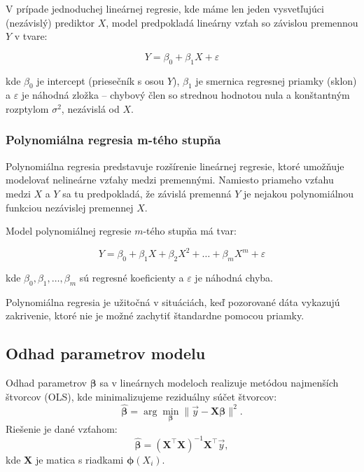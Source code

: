 V prípade jednoduchej lineárnej regresie, kde máme len jeden vysvetľujúci (nezávislý) prediktor $X$, model predpokladá lineárny vzťah so závislou premennou $Y$ v tvare:

\begin{equation}
Y = \beta_0 + \beta_1 X + \varepsilon
\end{equation}

kde $\beta_0$ je intercept (priesečník s osou $Y$), $\beta_1$ je smernica regresnej priamky (sklon) a $\varepsilon$ je náhodná zložka – chybový člen so strednou hodnotou nula a konštantným rozptylom $\sigma^2$, nezávislá od $X$.

\subsubsection{Polynomiálna regresia m-tého stupňa}
\label{subsec:polynomial_regression}

Polynomiálna regresia predstavuje rozšírenie lineárnej regresie, ktoré umožňuje modelovať nelineárne vzťahy medzi premennými. Namiesto priameho vzťahu medzi $X$ a $Y$ sa tu predpokladá, že závislá premenná $Y$ je nejakou polynomiálnou funkciou nezávislej premennej $X$.

Model polynomiálnej regresie $m$-tého stupňa má tvar:

\begin{equation}
Y = \beta_0 + \beta_1 X + \beta_2 X^2 + \dots + \beta_m X^m + \varepsilon
\end{equation}

kde $\beta_0, \beta_1, \dots, \beta_m$ sú regresné koeficienty a $\varepsilon$ je náhodná chyba.

Polynomiálna regresia je užitočná v situáciách, keď pozorované dáta vykazujú zakrivenie, ktoré nie je možné zachytiť štandardne pomocou priamky.

\subsection{Odhad parametrov modelu}\label{subsec:odhad_parametrov_modelu}

Odhad parametrov $\boldsymbol{\beta}$ sa v lineárnych modeloch realizuje metódou najmenších štvorcov (OLS), kde minimalizujeme reziduálny súčet štvorcov:
\begin{equation}
\hat{\boldsymbol{\beta}} = \arg\min_{\boldsymbol{\beta}} \| \vec{y} - \mathbf{X} \boldsymbol{\beta} \|^2.
\end{equation}
Riešenie je dané vzťahom:
\begin{equation}
\hat{\boldsymbol{\beta}} = (\mathbf{X}^\top \mathbf{X})^{-1} \mathbf{X}^\top \vec{y},
\end{equation}
kde $\mathbf{X}$ je matica s riadkami $\boldsymbol{\phi}(X_i)$.

